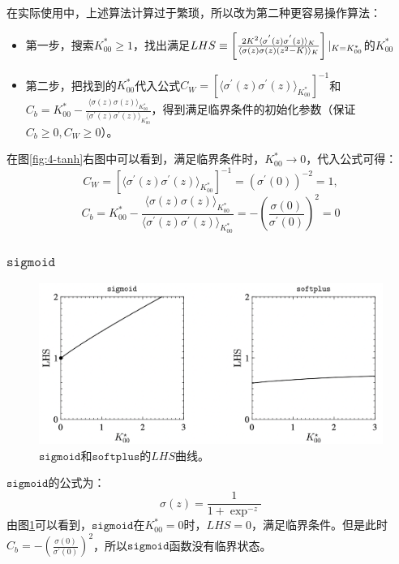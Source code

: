 在实际使用中，上述算法计算过于繁琐，所以改为第二种更容易操作算法：
\begin{itemize}
    \item 第一步，搜索$K_{00}^{*}\ge1$，找出满足$LHS\equiv\left[\frac{2K^2 \langle\sigma^{'}(z)\sigma^{'}(z)\rangle_K}{\langle\sigma(z)\sigma(z)(z^2-K)\rangle_K}\right]\arrowvert_{K=K_{00}^*}$的$K_{00}^{*}$
    \item 第二步，把找到的$K_{00}^{*}$代入公式$C_W=[\langle\sigma^{'}(z)\sigma^{'}(z)\rangle_{K_{00}^*}]^{-1}$和$C_b=K_{00}^*-\frac{\langle\sigma(z)\sigma(z)\rangle_{K_{00}^*}}{\langle\sigma^{'}(z)\sigma^{'}(z)\rangle_{K_{00}^*}}$，得到满足临界条件的初始化参数（保证$C_b\ge0, C_W\ge 0$）。
\end{itemize}
在图\ref{fig:4-tanh}右图中可以看到，满足临界条件时，$K_{00}^*\to0$，代入公式可得：
\begin{equation}
    C_W=\left[\langle\sigma^{'}(z)\sigma^{'}(z)\rangle_{K_{00}^*}\right]^{-1}=(\sigma^{'}(0))^{-2}=1,
\end{equation}
\begin{equation} 
    C_b=K_{00}^*-\frac{\langle\sigma(z)\sigma(z)\rangle_{K_{00}^*}}{\langle\sigma^{'}(z)\sigma^{'}(z)\rangle_{K_{00}^*}}=-\left(\frac{\sigma(0)}{\sigma^{'}(0)}\right)^2=0
\end{equation}

\subsubsection{$\texttt{sigmoid}$}
\begin{figure}[!ht]
    \includegraphics[width=\textwidth]{images/4_sigmoid_softplus.bmp}
    \caption{
        $\texttt{sigmoid}$和$\texttt{softplus}$的$LHS$曲线。
    }
    \label{fig:4-sigmoid}
\end{figure}
$\texttt{sigmoid}$的公式为：
\begin{equation}
    \sigma(z)=\frac{1}{1+\exp^{-z}}
\end{equation}
由图\ref{fig:4-sigmoid}可以看到，$\texttt{sigmoid}$在$K_{00}^*=0$时，$LHS=0$，满足临界条件。但是此时$C_b=-\left(\frac{\sigma(0)}{\sigma^{'}(0)}\right)^2$，所以$\texttt{sigmoid}$函数没有临界状态。

